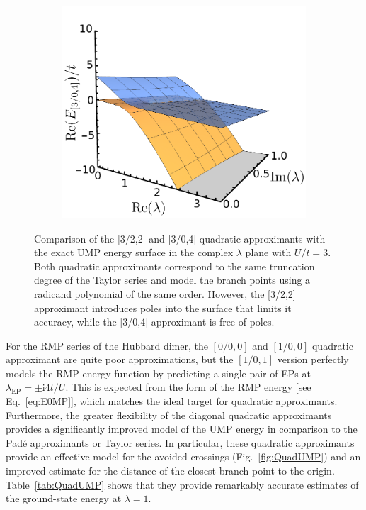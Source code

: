 \documentclass[aps,prb,reprint,noshowkeys,superscriptaddress]{revtex4-1}
\renewcommand{\i}{\mathrm{i}} %
\begin{document}
\begin{figure}
	\begin{subfigure}{0.32\textwidth}
        \includegraphics[height=0.85\textwidth]{fig11c}	
    \end{subfigure}
\caption{%
Comparison of the [3/2,2] and [3/0,4] quadratic approximants with the exact UMP energy surface in the complex $\lambda$ 
plane with $U/t = 3$. 
Both quadratic approximants correspond to the same truncation degree of the Taylor series and model the branch points 
using a radicand polynomial of the same order.
However, the [3/2,2] approximant introduces poles into the surface that limits it accuracy, while the [3/0,4] approximant
is free of poles.}
\label{fig:nopole_quad}
\end{figure}

For the RMP series of the Hubbard dimer, the $[0/0,0]$ and $[1/0,0]$ quadratic approximant 
are quite poor approximations, but the $[1/0,1]$ version perfectly models the RMP energy
function by predicting a single pair of EPs at $\lambda_\text{EP} = \pm \i 4t/U$.
This is expected from the form of the RMP energy [see Eq.~\eqref{eq:E0MP}], which matches 
the ideal target for quadratic approximants.
Furthermore, the greater flexibility of the diagonal quadratic approximants provides a significantly
improved model of the UMP energy in comparison to the Pad\'e approximants or Taylor series.
In particular, these quadratic approximants provide an effective model for the avoided crossings 
(Fig.~\ref{fig:QuadUMP}) and an improved estimate for the distance of the 
closest branch point  to the origin.
Table~\ref{tab:QuadUMP} shows that they provide remarkably accurate 
estimates of the ground-state energy at $\lambda = 1$.
\end{document}
